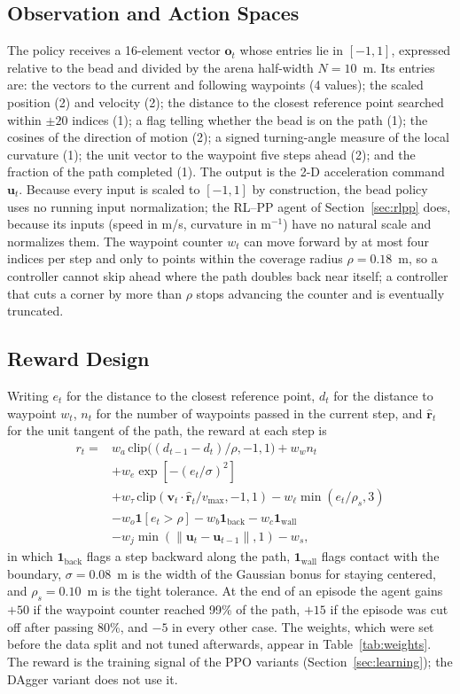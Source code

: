\documentclass[conference]{IEEEtran}
\begin{document}
\subsection{Observation and Action Spaces}
The policy receives a 16-element vector $\mathbf{o}_t$ whose entries lie in $[-1,1]$, expressed relative to the bead and divided by the arena half-width $N=10$~m. Its entries are: the vectors to the current and following waypoints (4 values); the scaled position (2) and velocity (2); the distance to the closest reference point searched within $\pm20$ indices (1); a flag telling whether the bead is on the path (1); the cosines of the direction of motion (2); a signed turning-angle measure of the local curvature (1); the unit vector to the waypoint five steps ahead (2); and the fraction of the path completed (1). The output is the 2-D acceleration command $\mathbf{u}_t$. Because every input is scaled to $[-1,1]$ by construction, the bead policy uses no running input normalization; the RL--PP agent of Section~\ref{sec:rlpp} does, because its inputs (speed in m/s, curvature in m$^{-1}$) have no natural scale and~\cite{elgouhary2026} normalizes them. The waypoint counter $w_t$ can move forward by at most four indices per step and only to points within the coverage radius $\rho=0.18$~m, so a controller cannot skip ahead where the path doubles back near itself; a controller that cuts a corner by more than $\rho$ stops advancing the counter and is eventually truncated.

\subsection{Reward Design}
Writing $e_t$ for the distance to the closest reference point, $d_t$ for the distance to waypoint $w_t$, $n_t$ for the number of waypoints passed in the current step, and $\hat{\mathbf{r}}_t$ for the unit tangent of the path, the reward at each step is
\begin{align}
r_t={}&w_a\,\mathrm{clip}\big((d_{t-1}-d_t)/\rho,-1,1\big)+w_w n_t\nonumber\\
&+w_e\exp[-(e_t/\sigma)^2]\nonumber\\
&+w_\tau\,\mathrm{clip}(\mathbf{v}_t\cdot\hat{\mathbf{r}}_t/v_{\max},-1,1)-w_\ell\min(e_t/\rho_s,3)\nonumber\\
&-w_o\mathbf{1}[e_t>\rho]-w_b\mathbf{1}_{\mathrm{back}}-w_c\mathbf{1}_{\mathrm{wall}}\nonumber\\
&-w_j\min(\|\mathbf{u}_t-\mathbf{u}_{t-1}\|,1)-w_s,\label{eq:reward}
\end{align}
in which $\mathbf{1}_{\mathrm{back}}$ flags a step backward along the path, $\mathbf{1}_{\mathrm{wall}}$ flags contact with the boundary, $\sigma=0.08$~m is the width of the Gaussian bonus for staying centered, and $\rho_s=0.10$~m is the tight tolerance. At the end of an episode the agent gains $+50$ if the waypoint counter reached 99\% of the path, $+15$ if the episode was cut off after passing 80\%, and $-5$ in every other case. The weights, which were set before the data split and not tuned afterwards, appear in Table~\ref{tab:weights}. The reward is the training signal of the PPO variants (Section~\ref{sec:learning}); the DAgger variant does not use it.
\end{document}
